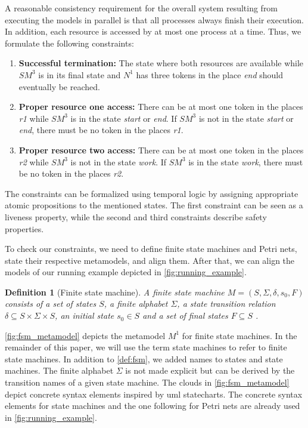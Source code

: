 \documentclass[conference]{IEEEtran}
\newtheorem{definition}{Definition}
\begin{document}
A reasonable consistency requirement for the overall system resulting from executing the models in parallel is that all processes always finish their execution.
In addition, each resource is accessed by at most one process at a time.
Thus, we formulate the following constraints:
\begin{enumerate}
    \item \textbf{Successful termination:} The state where both resources are available while $SM^3$ is in its final state and $N^1$ has three tokens in the place \textit{end} should eventually be reached.
    \item \textbf{Proper resource one access:} There can be at most one token in the places \textit{r1} while $SM^3$ is in the state \textit{start} or \textit{end}.
    If $SM^3$ is not in the state \textit{start} or \textit{end}, there must be no token in the places \textit{r1}.
    \item \textbf{Proper resource two access:} There can be at most one token in the places \textit{r2} while $SM^3$ is not in the state \textit{work}.
    If $SM^3$ is in the state \textit{work}, there must be no token in the places \textit{r2}.
\end{enumerate}

The constraints can be formalized using temporal logic by assigning appropriate atomic propositions to the mentioned states.
The first constraint can be seen as a liveness property, while the second and third constraints describe safety properties.

To check our constraints, we need to define finite state machines and Petri nets, state their respective metamodels, and align them.
After that, we can align the models of our running example depicted in \autoref{fig:running_example}.

\begin{definition}[Finite state machine] \label{def:fsm}
    A finite state machine $M=(S, \Sigma, \delta, s_0, F)$ consists of a set of states $S$, a finite alphabet $\Sigma$, a state transition relation $\delta \subseteq S \times \Sigma \times S$, an initial state $s_0 \in S$ and a set of final states $F \subseteq S$ \cite{kunzeBehaviouralModelsModelling2016}. %
\end{definition}

\autoref{fig:fsm_metamodel} depicts the metamodel $M^1$ for finite state machines.
In the remainder of this paper, we will use the term state machines to refer to finite state machines.
In addition to \autoref{def:fsm}, we added names to states and state machines.
The finite alphabet $\Sigma$ is not made explicit but can be derived by the transition names of a given state machine.
The clouds in \autoref{fig:fsm_metamodel} depict concrete syntax elements inspired by \gls{uml} statecharts.
The concrete syntax elements for state machines and the one following for Petri nets are already used in \autoref{fig:running_example}.
\end{document}
